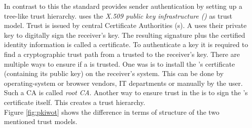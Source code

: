 In contrast to this the  standard \citep{RFC5751} provides sender authentication by setting up a tree-like trust hierarchy.  uses the \textit{X.509 public key infrastructure ()} \citep{RFC5280} as trust model. Trust is issued by central Certificate Authorities (s). A  uses their private key to digitally sign the receiver's key. The resulting signature plus the certified identity information is called a certificate. To authenticate a key it is required to find a cryptographic trust path from a trusted  to the receiver's key. There are multiple ways to ensure if a  is trusted. One was is to install the 's certificate (containing its public key) on the receiver's system. This can be done by operating-system or browser vendors, IT departments or manually by the user. Such a CA is called \textit{root CA}. Another way to ensure trust in the  is to sign the 's certificate itself. This creates a trust hierarchy. \\

Figure \ref{fig:pkiwot} shows the difference in terms of structure of the two mentioned trust models.

